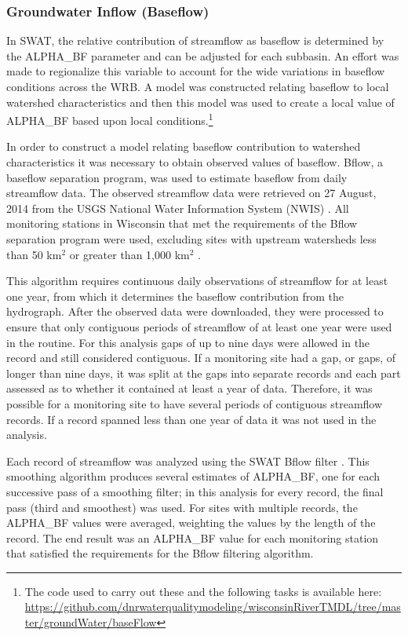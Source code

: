 \subsubsection{Groundwater Inflow (Baseflow)}\label{sec:baseflow}
	In SWAT, the relative contribution of streamflow as baseflow is determined by the ALPHA\_BF parameter and can be adjusted for each subbasin. An effort was made to regionalize this variable to account for the wide variations in baseflow conditions across the WRB. A model was constructed relating baseflow to local watershed characteristics and then this model was used to create a local value of ALPHA\_BF based upon local conditions.\footnote{The code used to carry out these and the following tasks is available here: \url{https://github.com/dnrwaterqualitymodeling/wisconsinRiverTMDL/tree/master/groundWater/baseFlow}}
	
	In order to construct a model relating baseflow contribution to watershed characteristics it was necessary to obtain observed values of baseflow. Bflow, a baseflow separation program, \citep{arnold_automated_1995} was used to estimate baseflow from daily streamflow data. The observed streamflow data were retrieved on 27 August, 2014 from the USGS National Water Information System (NWIS) \citep{usgs_nwis_2014}. All monitoring stations in Wisconsin that met the requirements of the Bflow separation program were used, excluding sites with upstream watersheds less than 50 km$^2$ or greater than 1,000 km$^2$ \citep{arnold_regional_2000}.

	This algorithm requires continuous daily observations of streamflow for at least one year, from which it determines the baseflow contribution from the hydrograph.	After the observed data were downloaded, they were processed to ensure that only contiguous periods of streamflow of at least one year were used in the routine. For this analysis gaps of up to nine days were allowed in the record and still considered contiguous. If a monitoring site had a gap, or gaps, of longer than nine days, it was split at the gaps into separate records and each part assessed as to whether it contained at least a year of data. Therefore, it was possible for a monitoring site to have several periods of contiguous streamflow records. If a record spanned less than one year of data it was not used in the analysis.
	
	Each record of streamflow was analyzed using the SWAT Bflow filter \citep{arnold_automated_1995}. This smoothing algorithm produces several estimates of ALPHA\_BF, one for each successive pass of a smoothing filter; in this analysis for every record, the final pass (third and smoothest) was used. For sites with multiple records, the ALPHA\_BF values were averaged, weighting the values by the length of the record. The end result was an ALPHA\_BF value for each monitoring station that satisfied the requirements for the Bflow filtering algorithm.  

